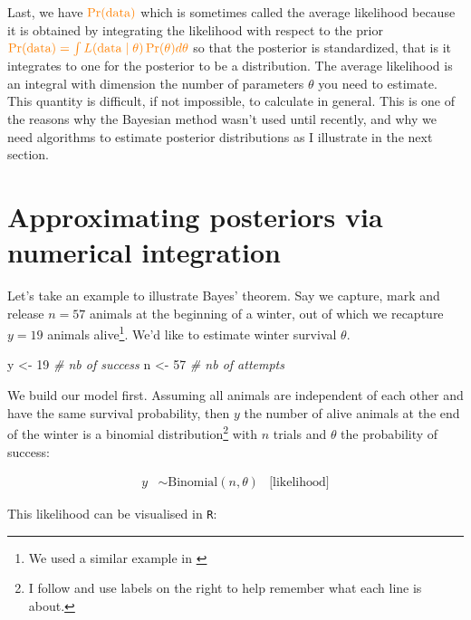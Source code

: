 \documentclass[
  12pt,
]{krantz}
\newenvironment{Shaded}{\begin{snugshade}}{\end{snugshade}}
\newcommand{\CommentTok}[1]{\textcolor[rgb]{0.56,0.35,0.01}{\textit{#1}}}
\newcommand{\DecValTok}[1]{\textcolor[rgb]{0.00,0.00,0.81}{#1}}
\newcommand{\NormalTok}[1]{#1}
\newcommand{\OtherTok}[1]{\textcolor[rgb]{0.56,0.35,0.01}{#1}}
\begin{document}
Last, we have \(\color{orange}{\Pr(\text{data})}\) which is sometimes called the average likelihood because it is obtained by integrating the likelihood with respect to the prior \(\color{orange}{\Pr(\text{data}) = \int{L(\text{data} \mid \theta)\Pr(\theta) d\theta}}\) so that the posterior is standardized, that is it integrates to one for the posterior to be a distribution. The average likelihood is an integral with dimension the number of parameters \(\theta\) you need to estimate. This quantity is difficult, if not impossible, to calculate in general. This is one of the reasons why the Bayesian method wasn't used until recently, and why we need algorithms to estimate posterior distributions as I illustrate in the next section.

\hypertarget{numerical-approx}{%
\section{Approximating posteriors via numerical integration}\label{numerical-approx}}

Let's take an example to illustrate Bayes' theorem. Say we capture, mark and release \(n = 57\) animals at the beginning of a winter, out of which we recapture \(y = 19\) animals alive\footnote{We used a similar example in \citet{king_bayesian_2009}}. We'd like to estimate winter survival \(\theta\).

\begin{Shaded}
\begin{Highlighting}[]
\NormalTok{y }\OtherTok{\textless{}{-}} \DecValTok{19} \CommentTok{\# nb of success}
\NormalTok{n }\OtherTok{\textless{}{-}} \DecValTok{57} \CommentTok{\# nb of attempts}
\end{Highlighting}
\end{Shaded}

We build our model first. Assuming all animals are independent of each other and have the same survival probability, then \(y\) the number of alive animals at the end of the winter is a binomial distribution\footnote{I follow \citet{mcelreathbook} and use labels on the right to help remember what each line is about.} with \(n\) trials and \(\theta\) the probability of success:

\begin{align*}
y &\sim \text{Binomial}(n, \theta) &\text{[likelihood]}
\end{align*}

This likelihood can be visualised in \texttt{R}:
\end{document}
